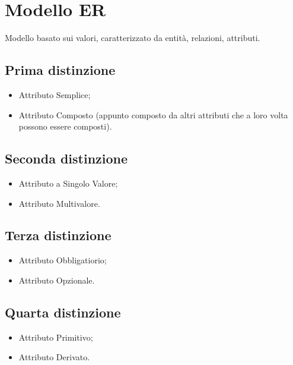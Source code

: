 \documentclass{article}
\title{}
\author{Trentin Tommaso}
\begin{document}
  \section{Modello ER}
    Modello basato sui valori, caratterizzato da entità, relazioni, attributi. 
    \subsection{Prima distinzione}
      \begin{itemize}
        \item Attributo Semplice;
        \item Attributo Composto (appunto composto da altri attributi che a loro volta possono essere composti).
      \end{itemize}
    \subsection{Seconda distinzione}
      \begin{itemize}
        \item Attributo a Singolo Valore;
        \item Attributo Multivalore.
      \end{itemize}
    \subsection{Terza distinzione}
      \begin{itemize}
        \item Attributo Obbligatiorio;
        \item Attributo Opzionale.
      \end{itemize}
    \subsection{Quarta distinzione}
      \begin{itemize}
        \item Attributo Primitivo;
        \item Attributo Derivato.
      \end{itemize}
\end{document}
